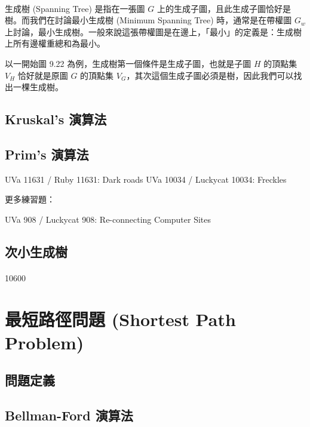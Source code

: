 \documentclass[12pt,a4paper,oneside]{report}
\begin{document}
\begin{CJK}{UTF8}{bkai}
\paragraph{}生成樹 (Spanning Tree) 是指在一張圖 $G$ 上的生成子圖，且此生成子圖恰好是樹。而我們在討論最小生成樹 (Minimum Spanning Tree) 時，通常是在帶權圖 $G_w$ 上討論，最小生成樹。一般來說這張帶權圖是在邊上，「最小」的定義是：生成樹上所有邊權重總和為最小。

以一開始圖 9.22 為例，生成樹第一個條件是生成子圖，也就是子圖 $H$ 的頂點集 $V_H$ 恰好就是原圖 $G$ 的頂點集 $V_G$，其次這個生成子圖必須是樹，因此我們可以找出一棵生成樹。

\subsection{Kruskal's 演算法}
\subsection{Prim's 演算法}

UVa 11631 / Ruby 11631: Dark roads
UVa 10034 / Luckycat 10034: Freckles

更多練習題：

UVa 908 / Luckycat 908: Re-connecting Computer Sites

\subsection{次小生成樹}
\paragraph{}10600

\section{最短路徑問題 (Shortest Path Problem)}
\subsection{問題定義}
\subsection{Bellman-Ford 演算法}


\end{CJK}
\end{document}
